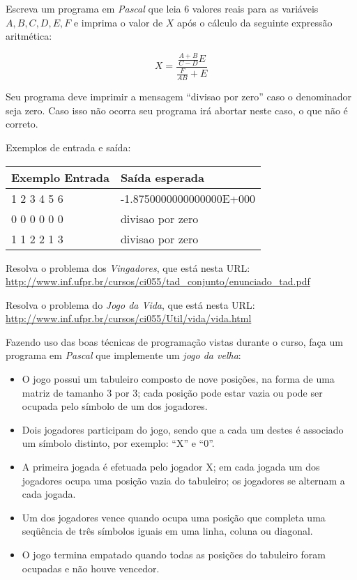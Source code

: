 \item Escreva um programa em \emph{Pascal} que leia
6 valores reais para as variáveis $A, B, C, D, E, F$ e
imprima o valor de $X$ após o cálculo
 da seguinte expressão aritmética:

     \[ X = \frac{\frac{A + B}{C - D}E}{\frac{F}{AB} + E} \]

Seu programa deve imprimir a mensagem ``divisao por zero''
caso o denominador seja zero. Caso isso não ocorra seu programa
irá abortar neste caso, o que não é correto.

Exemplos de entrada e saída:

\begin{center}
\begin{tabular}{|l|l|} \hline
Exemplo Entrada & Saída esperada \\ \hline
1 2 3 4 5 6     & -1.8750000000000000E+000  \\ \hline
0 0 0 0 0 0     & divisao por zero   \\ \hline
1 1 2 2 1 3     & divisao por zero   \\ \hline
\end{tabular}
\end{center}

\item Resolva o problema dos \emph{Vingadores}, que está nesta URL: \\
      \url{http://www.inf.ufpr.br/cursos/ci055/tad_conjunto/enunciado_tad.pdf}

\item Resolva o problema do \emph {Jogo da Vida}, que está nesta URL: \\
      \url{http://www.inf.ufpr.br/cursos/ci055/Util/vida/vida.html}

\item Fazendo uso das boas técnicas  de programação vistas durante o curso,
 faça um programa em  \emph{Pascal} que implemente  um \emph{jogo  da velha}:
 \begin{itemize}

  \item O jogo possui um tabuleiro composto de nove posições, na forma
  de uma matriz de  tamanho 3 por 3;  cada posição pode estar vazia ou
  pode ser ocupada pelo símbolo de um dos jogadores.

  \item Dois jogadores participam do jogo, sendo  que a cada um destes
  é associado um símbolo distinto, por exemplo: ``X'' e ``0''.

  \item A primeira jogada é efetuada pelo jogador X; em cada jogada um
  dos jogadores ocupa uma posição vazia  do tabuleiro; os jogadores se
  alternam a cada jogada.

  \item  Um dos jogadores vence  quando ocupa uma posição que completa
  uma seqüência   de  três símbolos   iguais em  uma  linha, coluna ou
  diagonal.

  \item O jogo termina empatado  quando todas as posições do tabuleiro
  foram ocupadas e não houve vencedor.
 \end{itemize}

